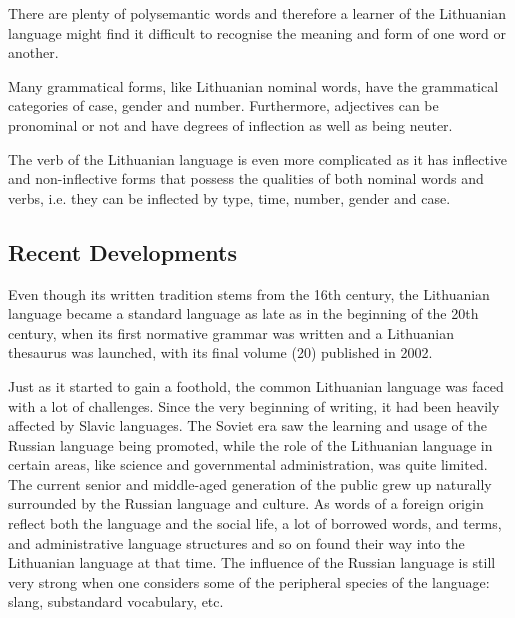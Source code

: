 \begin{multicols}{2}
There are plenty of polysemantic words and therefore a learner of the Lithuanian language might find it difficult to recognise the meaning and form of one word or another. 

Many grammatical forms, like Lithuanian nominal words, have the grammatical categories of case, gender and number. Furthermore, adjectives can be pronominal or not and have degrees of inflection as well as being neuter.

The verb of the Lithuanian language is even more complicated as it has inflective and non-inflective forms that possess the qualities of both nominal words and verbs, i.e. they can be inflected by type, time, number, gender and case.

\subsection{Recent Developments}

Even though its written tradition stems from the 16th century, the Lithuanian language became a standard language as late as in the beginning of the 20th century, when its first normative grammar was written and a Lithuanian thesaurus was launched, with its final volume (20) published in 2002.

   Just as it started to gain a foothold, the common Lithuanian language was faced with a lot of challenges. Since the very beginning of writing, it had been heavily affected by Slavic languages. The Soviet era saw the learning and usage of the Russian language being promoted, while the role of the Lithuanian language in certain areas, like science and governmental administration, was quite limited. The current senior and middle-aged generation of the public grew up naturally surrounded by the Russian language and culture. As words of a foreign origin reflect both the language and the social life, a lot of borrowed words, and terms, and administrative language structures and so on found their way into the Lithuanian language at that time. The influence of the Russian language is still very strong when one considers some of the peripheral species of the language: slang, substandard vocabulary, etc.


\end{multicols}
